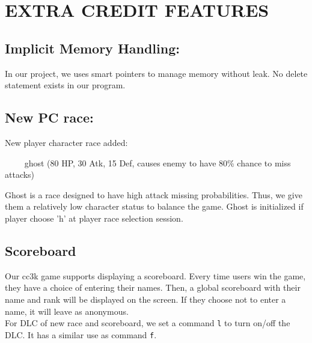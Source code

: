 \documentclass[11pt]{article}
\theoremstyle{plain} \newtheorem{theorem*}{Theorem}[subsection]
\begin{document}

\section{EXTRA CREDIT FEATURES}

\subsection{Implicit Memory Handling: }

In our project, we uses smart pointers to manage memory without leak. No delete 
statement exists in our program.

\subsection{New PC race: }

New player character race added: 

\textsf{\indent $\phantom{\qquad}$ ghost (80 HP, 30 Atk, 15 Def, causes enemy to 
have 80\% chance to miss attacks) }

Ghost is a race designed to have high attack missing probabilities. Thus, we 
give them a relatively low character status to balance the game. Ghost
is initialized if player choose 'h' at player race selection session.

\subsection{Scoreboard}

Our cc3k game supports displaying a scoreboard. 
Every time users win the game, they have a choice of entering their 
names. Then, a global scoreboard with their name and rank will be displayed on 
the screen. If they choose not to enter a name, it will leave as anonymous. \\

For DLC of new race and scoreboard, we set a command \texttt{l} to turn on/off 
the DLC. It has a similar use as command \texttt{f}.
\end{document}
